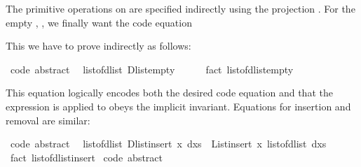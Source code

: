 \begin{isabellebody}
\begin{isamarkuptext}
  The primitive operations on  are specified
  indirectly using the projection .  For
  the empty , , we finally want
  the code equation%
\end{isamarkuptext}%
\isamarkuptrue%
%
\isadelimquote
%
\endisadelimquote
%
\isatagquote
%
\begin{isamarkuptext}%
%
\end{isamarkuptext}%
\isamarkuptrue%
%
\endisatagquote
{\isafoldquote}%
%
\isadelimquote
%
\endisadelimquote
%
\begin{isamarkuptext}%
\noindent This we have to prove indirectly as follows:%
\end{isamarkuptext}%
\isamarkuptrue%
%
\isadelimquote
%
\endisadelimquote
%
\isatagquote
{}\isamarkupfalse%
\ {\isacharbrackleft}code\ abstract{\isacharbrackright}{\isacharcolon}\isanewline
\ \ {\isachardoublequoteopen}list{\isacharunderscore}of{\isacharunderscore}dlist\ Dlist{\isachardot}empty\ {\isacharequal}\ {\isacharbrackleft}{\isacharbrackright}{\isachardoublequoteclose}\isanewline
\ \ \isamarkupfalse%
\ {\isacharparenleft}fact\ list{\isacharunderscore}of{\isacharunderscore}dlist{\isacharunderscore}empty{\isacharparenright}%
\endisatagquote
{\isafoldquote}%
%
\isadelimquote
%
\endisadelimquote
%
\begin{isamarkuptext}%
\noindent This equation logically encodes both the desired code
  equation and that the expression  is applied to obeys
  the implicit invariant.  Equations for insertion and removal are
  similar:%
\end{isamarkuptext}%
\isamarkuptrue%
%
\isadelimquote
%
\endisadelimquote
%
\isatagquote
{}\isamarkupfalse%
\ {\isacharbrackleft}code\ abstract{\isacharbrackright}{\isacharcolon}\isanewline
\ \ {\isachardoublequoteopen}list{\isacharunderscore}of{\isacharunderscore}dlist\ {\isacharparenleft}Dlist{\isachardot}insert\ x\ dxs{\isacharparenright}\ {\isacharequal}\ List{\isachardot}insert\ x\ {\isacharparenleft}list{\isacharunderscore}of{\isacharunderscore}dlist\ dxs{\isacharparenright}{\isachardoublequoteclose}\isanewline
\ \ \isamarkupfalse%
\ {\isacharparenleft}fact\ list{\isacharunderscore}of{\isacharunderscore}dlist{\isacharunderscore}insert{\isacharparenright}\isanewline
\isanewline
{}\isamarkupfalse%
\ {\isacharbrackleft}code\ abstract{\isacharbrackright}{\isacharcolon}\isanewline

\end{isabellebody}
